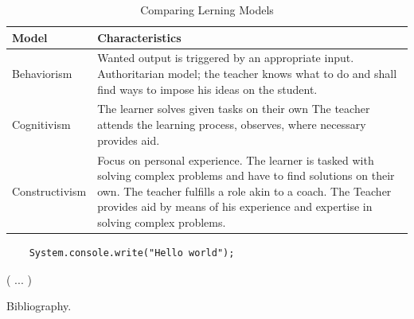 \begin{table} [H]
	\begin{tabular}{ |p{4cm}| p{9.0cm}| }
		\hline
		\textbf{Model}& \textbf{Characteristics}\\
		\hline
		Behaviorism & Wanted output is triggered by an appropriate input. Authoritarian model; the teacher knows what to do and shall find ways to impose his ideas on the student. \\
		Cognitivism & The learner solves given tasks on their own The teacher attends the learning process, observes, where necessary provides aid. \\
		Constructivism & Focus on personal experience. The learner is tasked with solving complex problems and have to find solutions on their own. The teacher fulfills a 	role akin to a coach. The Teacher provides aid by means of his experience and expertise in solving complex problems. \\
		\hline
	\end{tabular}
	\caption{\label{tab:learningModelComparison} Comparing Lerning Models}
\end{table}

\begin{lstlisting}
	System.console.write("Hello world");
\end{lstlisting}

( ... )

Bibliography{.}


